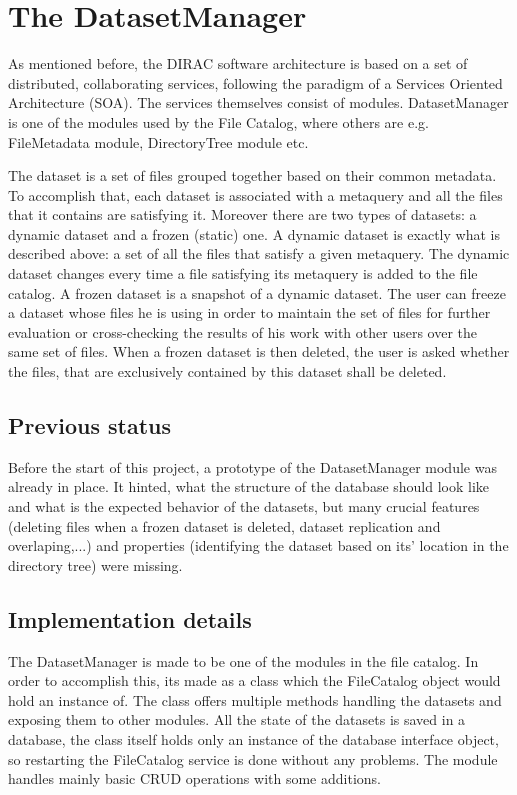\chapter{The DatasetManager}

As mentioned before, the DIRAC software architecture is based on a set of distributed,
collaborating services, following the paradigm of a Services
Oriented Architecture (SOA). The services themselves consist of
modules. DatasetManager is one of the modules used by the File Catalog, where others are
e.g. FileMetadata module, DirectoryTree module etc. 

The dataset is a set of files grouped together based on their common metadata. To accomplish
that, each dataset is associated with a metaquery and all the files that it contains are
satisfying it. Moreover there are two types of datasets: a dynamic dataset and 
a frozen (static) one. A dynamic dataset is exactly what is described above: a set of all the
files that satisfy a given metaquery. The dynamic dataset changes every time a file satisfying
its metaquery is added to the file catalog. A frozen dataset is a snapshot of a dynamic dataset. The
user can freeze a dataset whose files he is using in order to maintain the set of files for
further evaluation or cross-checking the results of his work with other users over the same
set of files. When a frozen dataset is then deleted, the user is asked whether the files, that 
are exclusively contained by this dataset shall be deleted. 

\section{Previous status}
Before the start of this project, a prototype of the DatasetManager module was already 
in place. It hinted, what the structure of the database should look like and what is the
expected behavior of the datasets, but many crucial features (deleting files when a 
frozen dataset is deleted, dataset replication and overlaping,...) and properties (identifying
the dataset based on its' location in the directory tree) were missing.

\section{Implementation details}

The DatasetManager is made to be one of the modules in the file catalog. In order to accomplish
this, its made as a class which the FileCatalog object would hold an instance of. The class offers
multiple methods handling the datasets and exposing them to other modules. All the state of the 
datasets is saved in a database, the class itself holds only an instance of the database interface
object, so restarting the FileCatalog service is done without any problems. The module handles mainly
basic CRUD operations with some additions.

